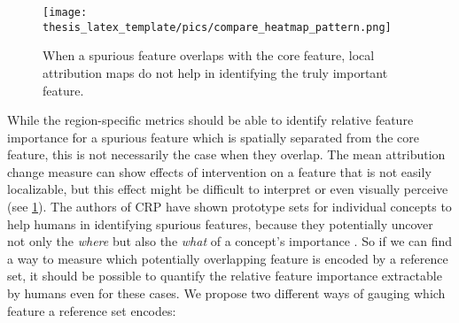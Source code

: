 \begin{figure}[t!]
    \centering
    \texttt{[image: thesis\_latex\_template/pics/compare\_heatmap\_pattern.png]}
    \caption[Distinguish heatmaps for different patterns]{When a spurious feature overlaps with the core feature, local attribution maps do not help in identifying the truly important feature.}
    \label{fig:compare_heatmap_pattern}
\end{figure}

While the region-specific metrics should be able to identify relative feature importance for a spurious feature which is spatially separated from the core feature, this is not necessarily the case when they overlap. The mean attribution change measure can show effects of intervention on a feature that is not easily localizable, but this effect might be difficult to interpret or even visually perceive (see \cref{fig:compare_heatmap_pattern}). The authors of CRP have shown prototype sets for individual concepts to help humans in identifying spurious features, because they potentially uncover not only the \textit{where} but also the \textit{what} of a concept's importance \citep{Achtibat2023}. So if we can find a way to measure which potentially overlapping feature is encoded by a reference set, it should be possible to quantify the relative feature importance extractable by humans even for these cases. 
We propose two different ways of gauging which feature a reference set encodes:

